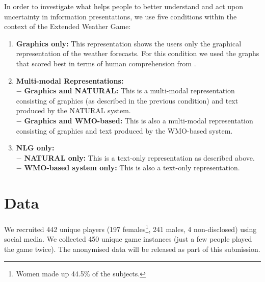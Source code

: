 \documentclass[11pt]{article}
\begin{document}
In order to investigate what helps people to  better understand and act upon uncertainty in information presentations, we use five conditions within the context of the Extended Weather Game:
\begin{enumerate}
\item \textbf{Graphics only:} This representation shows the users only the graphical representation of the weather forecasts. For this condition we used the graphs that scored best in terms of human comprehension from \cite{Stephens2011}.
\item \textbf{Multi-modal Representations:}\\
{$-$ \bf Graphics and NATURAL:} This is a multi-modal representation consisting of graphics (as described in the previous condition) and text produced by the NATURAL system.\\
{$-$ \bf Graphics and WMO-based:} This is also a multi-modal representation consisting of graphics and text produced by the WMO-based system.
\item \textbf{NLG only:}\\
{$-$ \bf NATURAL only:} This is a text-only representation as described above. \\
{$-$ \bf WMO-based system only:} This is also a text-only representation. 
\end{enumerate}

\section{Data} \label{sec:data}
We recruited 442 unique players (197 females\footnote{Women made up 44.5\% of the subjects.}, 241 males, 4 non-disclosed) using social media. We collected 450 unique game instances (just a few people played the game twice). 
The anonymised data will be released as part of this submission.
\end{document}
